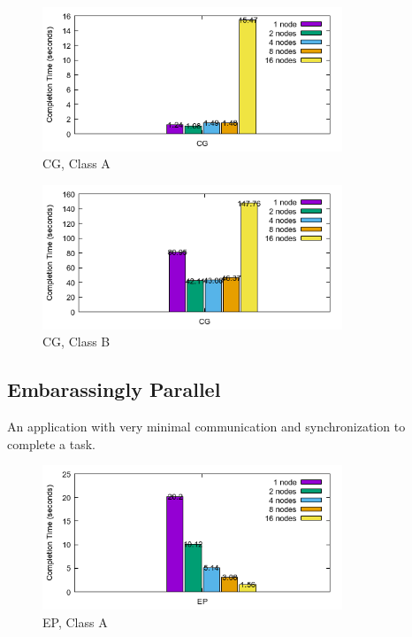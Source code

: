 \documentclass[a4paper]{article}
\begin{document}
\begin{figure}[H]
\centering
\includegraphics[width=0.8\textwidth]{figures/CGvA.png}
\caption{\label{fig:CGvA}CG, Class A}
\end{figure}

\begin{figure}[H]
\centering
\includegraphics[width=0.8\textwidth]{figures/CGvB.png}
\caption{\label{fig:CGvB}CG, Class B}
\end{figure}

\subsection{Embarassingly Parallel}

An application with very minimal communication and synchronization to complete a task.

\begin{figure}[H]
\centering
\includegraphics[width=0.8\textwidth]{figures/EPvA.png}
\caption{\label{fig:EPvA}EP, Class A}
\end{figure}
\end{document}
